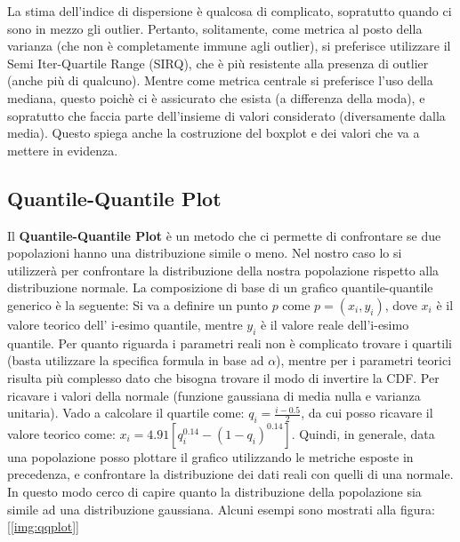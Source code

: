 La stima dell'indice di dispersione è qualcosa di complicato, sopratutto quando ci sono in mezzo gli outlier. Pertanto, solitamente, come metrica al posto della varianza (che non è completamente immune agli outlier), si preferisce utilizzare il Semi Iter-Quartile Range (SIRQ), che è più resistente alla presenza di outlier (anche più di qualcuno). Mentre come metrica centrale si preferisce l'uso della mediana, questo poichè ci è assicurato che esista (a differenza della moda), e sopratutto che faccia parte dell'insieme di valori considerato (diversamente dalla media). Questo spiega anche la costruzione del boxplot e dei valori che va a mettere in evidenza.

\subsection{Quantile-Quantile Plot}
Il \textbf{Quantile-Quantile Plot} è un metodo che ci permette di confrontare se due popolazioni hanno una distribuzione simile o meno. Nel nostro caso lo si utilizzerà per confrontare la distribuzione della nostra popolazione rispetto alla distribuzione normale.
La composizione di base di un grafico quantile-quantile generico è la seguente:
Si va a definire un punto \(p\) come \(p = (x_i, y_i)\), dove \(x_i\) è il valore teorico dell' i-esimo quantile, mentre \(y_i\) è il valore reale dell'i-esimo quantile. Per quanto riguarda i parametri reali non è complicato trovare i quartili (basta utilizzare la specifica formula in base ad \(\alpha\)), mentre per i parametri teorici risulta più complesso dato che bisogna trovare il modo di invertire la CDF. Per ricavare i valori della normale (funzione gaussiana di media nulla e varianza unitaria). Vado a calcolare il quartile come: \(q_i = \frac{i-0.5}{2}\), da cui posso ricavare il valore teorico come: \(x_i = 4.91\left [ q_i^{0.14} - (1-q_i)^{0.14} \right ]\).
Quindi, in generale, data una popolazione posso plottare il grafico utilizzando le metriche esposte in precedenza, e confrontare la distribuzione dei dati reali con quelli di una normale. In questo modo cerco di capire quanto la distribuzione della popolazione sia simile ad una distribuzione gaussiana. Alcuni esempi sono mostrati alla figura: [\ref{img:qqplot}]

